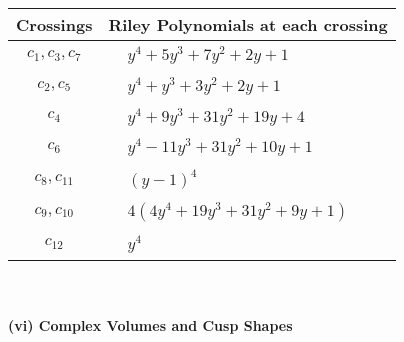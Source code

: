\documentclass[1p]{elsarticle_modified}
\theoremstyle{definition}
\begin{document}
\begin{tabular}{m{50pt}|m{274pt}}
Crossings & \hspace{64pt}Riley Polynomials at each crossing \\
\hline $$\begin{aligned}c_{1},c_{3},c_{7}\end{aligned}$$&$\begin{aligned}
&y^4+5 y^3+7 y^2+2 y+1
\end{aligned}$\\
\hline $$\begin{aligned}c_{2},c_{5}\end{aligned}$$&$\begin{aligned}
&y^4+y^3+3 y^2+2 y+1
\end{aligned}$\\
\hline $$\begin{aligned}c_{4}\end{aligned}$$&$\begin{aligned}
&y^4+9 y^3+31 y^2+19 y+4
\end{aligned}$\\
\hline $$\begin{aligned}c_{6}\end{aligned}$$&$\begin{aligned}
&y^4-11 y^3+31 y^2+10 y+1
\end{aligned}$\\
\hline $$\begin{aligned}c_{8},c_{11}\end{aligned}$$&$\begin{aligned}
&(y-1)^4
\end{aligned}$\\
\hline $$\begin{aligned}c_{9},c_{10}\end{aligned}$$&$\begin{aligned}
&4(4 y^4+19 y^3+31 y^2+9 y+1)
\end{aligned}$\\
\hline $$\begin{aligned}c_{12}\end{aligned}$$&$\begin{aligned}
&y^4
\end{aligned}$\\
\hline
\end{tabular}\\~\\
\newpage\flushleft \textbf{(vi) Complex Volumes and Cusp Shapes}
\end{document}
